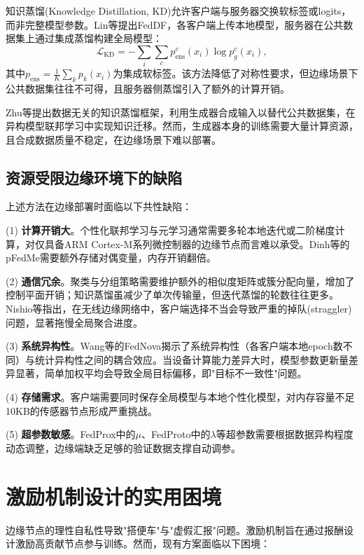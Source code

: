 \documentclass[a4paper,12pt]{article}
\begin{document}
知识蒸馏(Knowledge Distillation, KD)允许客户端与服务器交换软标签或logits，而非完整模型参数。Lin等\cite{lin2020ensemble}提出FedDF，各客户端上传本地模型，服务器在公共数据集上通过集成蒸馏构建全局模型：
\begin{equation}
\mathcal{L}_{\text{KD}} = -\sum_{i} \sum_{c} p_{\text{ens}}^c(x_i) \log p_{g}^c(x_i),
\end{equation}
其中$p_{\text{ens}} = \frac{1}{K}\sum_k p_k(x_i)$为集成软标签。该方法降低了对称性要求，但边缘场景下公共数据集往往不可得，且服务器侧蒸馏引入了额外的计算开销。

Zhu等\cite{zhu2021data}提出数据无关的知识蒸馏框架，利用生成器合成输入以替代公共数据集，在异构模型联邦学习中实现知识迁移。然而，生成器本身的训练需要大量计算资源，且合成数据质量不稳定，在边缘场景下难以部署。

\subsection{资源受限边缘环境下的缺陷}

上述方法在边缘部署时面临以下共性缺陷：

(1) \textbf{计算开销大}。个性化联邦学习与元学习通常需要多轮本地迭代或二阶梯度计算，对仅具备ARM Cortex-M系列微控制器的边缘节点而言难以承受。Dinh等\cite{dinh2020personalized}的pFedMe需要额外存储对偶变量，内存开销翻倍。

(2) \textbf{通信冗余}。聚类与分组策略需要维护额外的相似度矩阵或簇分配向量，增加了控制平面开销；知识蒸馏虽减少了单次传输量，但迭代蒸馏的轮数往往更多。Nishio等\cite{nishio2019client}指出，在无线边缘网络中，客户端选择不当会导致严重的掉队(straggler)问题，显著拖慢全局聚合进度。

(3) \textbf{系统异构性}。Wang等\cite{wang2020tackling}的FedNova揭示了系统异构性（各客户端本地epoch数不同）与统计异构性之间的耦合效应。当设备计算能力差异大时，模型参数更新量差异显著，简单加权平均会导致全局目标偏移，即"目标不一致性"问题。

(4) \textbf{存储需求}。客户端需要同时保存全局模型与本地个性化模型，对内存容量不足10KB的传感器节点形成严重挑战。

(5) \textbf{超参数敏感}。FedProx中的$\mu$、FedProto中的$\lambda$等超参数需要根据数据异构程度动态调整，边缘端缺乏足够的验证数据支撑自动调参。

\section{激励机制设计的实用困境}

边缘节点的理性自私性导致"搭便车"与"虚假汇报"问题。激励机制旨在通过报酬设计激励高贡献节点参与训练。然而，现有方案面临以下困境：
\end{document}
